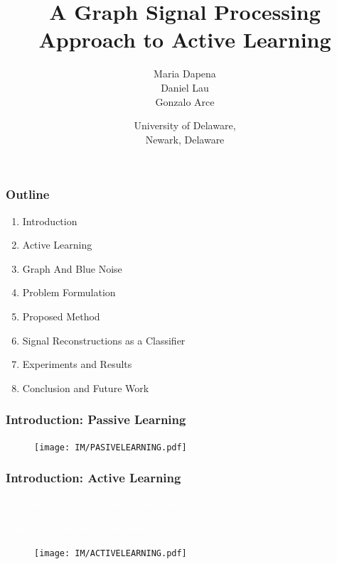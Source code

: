 \documentclass[11pts]{beamer}
\title{\LARGE{A Graph Signal Processing Approach to Active Learning}}%
\author[Maria Dapena\\ Daniel Lau \\ Gonzalo Arce]{\large{Maria Dapena\\Daniel Lau \\ Gonzalo Arce}}
\date{ University of Delaware,\\ Newark, Delaware}
\begin{document}
\normalsize

\begin{frame}%
	\titlepage
\end{frame}

\begin{frame}%
\frametitle{Outline}
    \begin{enumerate}
        
        \item Introduction
        \item Active Learning
        \item Graph And Blue Noise
        \item Problem Formulation
        \item Proposed Method
        \item Signal Reconstructions as a Classifier
        \item Experiments and Results 
        \item Conclusion and Future Work

    \end{enumerate}
\end{frame}


\begin{frame}%
\frametitle{Introduction: Passive Learning}
    \begin{figure}
        \centering
        \texttt{[image: IM/PASIVELEARNING.pdf]}
    \end{figure}
\end{frame}



\begin{frame}%
\frametitle{Introduction: Active Learning}
\begin{tcolorbox}[width=\textwidth,colback={bar}]    
   \textcolor{white}{Is it possible to train machines with less labeled data?}
   
    \textcolor{white}{Can we use less human resources?}
\end{tcolorbox} 

    \begin{figure}
        \centering
        \texttt{[image: IM/ACTIVELEARNING.pdf]}
    \end{figure}
\end{frame}
\end{document}
